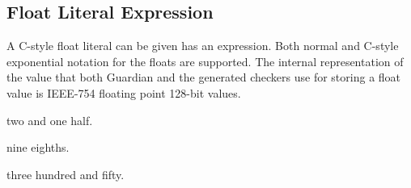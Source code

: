 
\subsection{Float Literal Expression}
{
	A C-style float literal can be given has an expression.
	Both normal and C-style exponential notation for the floats are supported.
	The internal representation of the value that both Guardian and the
	generated checkers use for storing a float value is IEEE-754 floating point
	128-bit values.
	
	\begin{itemize}
	{
		\item[\texttt{2.5}] two and one half.
		
		\item[\texttt{1.125}] nine eighths.
		
		\item[\texttt{3.5e2}] three hundred and fifty.
	}
	\end{itemize}
}
